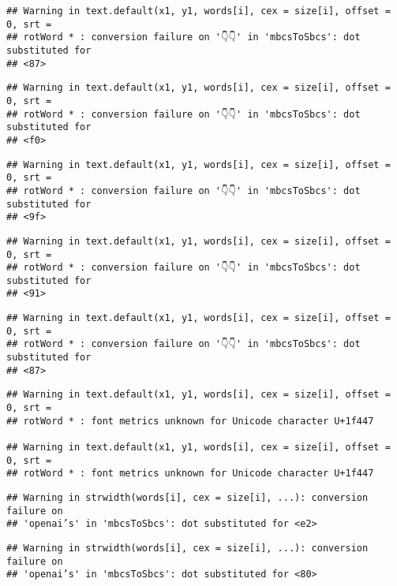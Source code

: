 \documentclass[
]{article}
\begin{document}
\begin{verbatim}
## Warning in text.default(x1, y1, words[i], cex = size[i], offset = 0, srt =
## rotWord * : conversion failure on '👇👇' in 'mbcsToSbcs': dot substituted for
## <87>
\end{verbatim}

\begin{verbatim}
## Warning in text.default(x1, y1, words[i], cex = size[i], offset = 0, srt =
## rotWord * : conversion failure on '👇👇' in 'mbcsToSbcs': dot substituted for
## <f0>
\end{verbatim}

\begin{verbatim}
## Warning in text.default(x1, y1, words[i], cex = size[i], offset = 0, srt =
## rotWord * : conversion failure on '👇👇' in 'mbcsToSbcs': dot substituted for
## <9f>
\end{verbatim}

\begin{verbatim}
## Warning in text.default(x1, y1, words[i], cex = size[i], offset = 0, srt =
## rotWord * : conversion failure on '👇👇' in 'mbcsToSbcs': dot substituted for
## <91>
\end{verbatim}

\begin{verbatim}
## Warning in text.default(x1, y1, words[i], cex = size[i], offset = 0, srt =
## rotWord * : conversion failure on '👇👇' in 'mbcsToSbcs': dot substituted for
## <87>
\end{verbatim}

\begin{verbatim}
## Warning in text.default(x1, y1, words[i], cex = size[i], offset = 0, srt =
## rotWord * : font metrics unknown for Unicode character U+1f447

## Warning in text.default(x1, y1, words[i], cex = size[i], offset = 0, srt =
## rotWord * : font metrics unknown for Unicode character U+1f447
\end{verbatim}

\begin{verbatim}
## Warning in strwidth(words[i], cex = size[i], ...): conversion failure on
## 'openai’s' in 'mbcsToSbcs': dot substituted for <e2>
\end{verbatim}

\begin{verbatim}
## Warning in strwidth(words[i], cex = size[i], ...): conversion failure on
## 'openai’s' in 'mbcsToSbcs': dot substituted for <80>
\end{verbatim}
\end{document}
